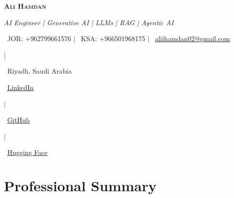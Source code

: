 \documentclass[letterpaper,11pt]{article}
\begin{document}

\begin{center}

    \textbf{\Huge \scshape \color{primary}Ali Hamdan}
    
    \vspace{2pt}
    
    \small
    \textit{AI Engineer | Generative AI | LLMs | RAG | Agentic AI}
    
    \vspace{3pt}
    
    \faPhone\ JOR: +962799661576 $|$
    \faPhone\ KSA: +966501968175 $|$
    \faEnvelope\ 
    \href{mailto:aliihamdan02@gmail.com}
    {\underline{aliihamdan02@gmail.com}}
    
    $|$
    
    \faMapMarker\ Riyadh, Saudi Arabia
    
    \vspace{2pt}
    
    \faLinkedin\
    \href{https://www.linkedin.com/in/ali-hamdan-a6678a25a/}
    {\underline{LinkedIn}}
    
    $|$
    
    \faGithub\
    \href{https://github.com/alihamdan02}
    {\underline{GitHub}}
    
    $|$
    
    \faCode\
    \href{https://huggingface.co/alihamdan02}
    {\underline{Hugging Face}}

\end{center}



\section{Professional Summary}
\end{document}
